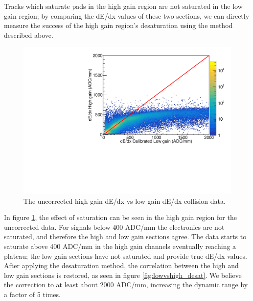 \documentclass[review]{elsarticle}
\begin{document}
Tracks which saturate pads in the high gain region are not saturated in the low gain region; by comparing the dE/dx values of these two sections, we can directly measure the success of the high gain region's desaturation using the method described above.  

\begin{figure}[H]
\includegraphics[width=\linewidth]{dedxcompare_nodesat}
\caption{The uncorrected high gain dE/dx vs low gain dE/dx collision data.  }
\label{fig:lowvshigh_raw}
\end{figure}
 
In figure \ref{fig:lowvshigh_raw}, the effect of saturation can be seen in the high gain region for the uncorrected data. For signals below 400 ADC/mm the electronics are not saturated, and therefore the high and low gain sections agree. The data starts to saturate above 400 ADC/mm in the high gain channels eventually reaching a plateau; the low gain sections have not saturated and provide true dE/dx values.
 After applying the desaturation method, the correlation between the high and low gain sections is restored, as seen in figure \ref{fig:lowvshigh_desat}. We believe the correction to at least about 2000 ADC/mm, increasing the dynamic range by a factor of 5 times.
\end{document}

